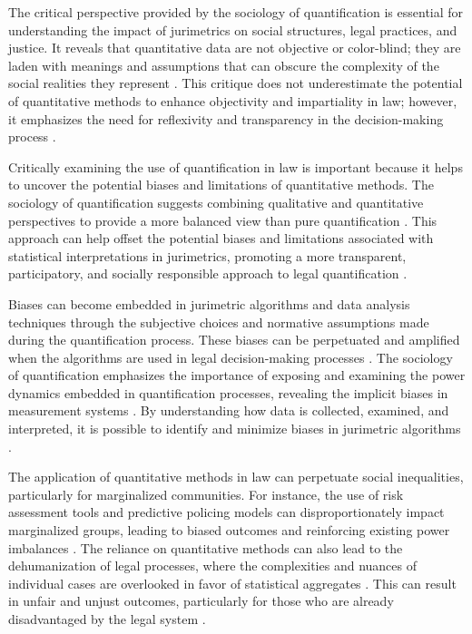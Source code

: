 The critical perspective provided by the sociology of quantification is essential for understanding the impact of jurimetrics on social structures, legal practices, and justice. It reveals that quantitative data are not objective or color-blind; they are laden with meanings and assumptions that can obscure the complexity of the social realities they represent \cite{10.1057/s41599-020-00557-0, de2010jurimetrics}. This critique does not underestimate the potential of quantitative methods to enhance objectivity and impartiality in law; however, it emphasizes the need for reflexivity and transparency in the decision-making process \cite{10.1057/s41599-020-00557-0, de2010jurimetrics}.

Critically examining the use of quantification in law is important because it helps to uncover the potential biases and limitations of quantitative methods. The sociology of quantification suggests combining qualitative and quantitative perspectives to provide a more balanced view than pure quantification \cite{10.1057/s41599-020-00557-0, de2010jurimetrics}. This approach can help offset the potential biases and limitations associated with statistical interpretations in jurimetrics, promoting a more transparent, participatory, and socially responsible approach to legal quantification \cite{10.1057/s41599-020-00557-0, de2010jurimetrics}.

Biases can become embedded in jurimetric algorithms and data analysis techniques through the subjective choices and normative assumptions made during the quantification process. These biases can be perpetuated and amplified when the algorithms are used in legal decision-making processes \cite{10.1590/data.2022.65.3.267,10.1007/978-3-319-44000-2_15}. The sociology of quantification emphasizes the importance of exposing and examining the power dynamics embedded in quantification processes, revealing the implicit biases in measurement systems \cite{10.1057/s41599-020-00557-0,10.1080/07329113.2015.1046739}. By understanding how data is collected, examined, and interpreted, it is possible to identify and minimize biases in jurimetric algorithms \cite{10.1590/data.2022.65.3.267,10.1007/978-3-319-44000-2_15}.

The application of quantitative methods in law can perpetuate social inequalities, particularly for marginalized communities. For instance, the use of risk assessment tools and predictive policing models can disproportionately impact marginalized groups, leading to biased outcomes and reinforcing existing power imbalances \cite{10.1057/s41599-020-00557-0}. The reliance on quantitative methods can also lead to the dehumanization of legal processes, where the complexities and nuances of individual cases are overlooked in favor of statistical aggregates \cite{10.1057/s41599-020-00557-0}. This can result in unfair and unjust outcomes, particularly for those who are already disadvantaged by the legal system \cite{10.1057/s41599-020-00557-0}.

